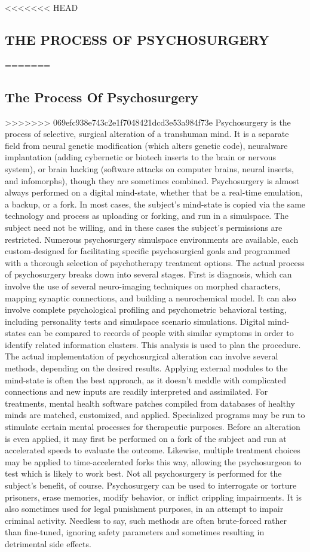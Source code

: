 <<<<<<< HEAD
\subsection{THE PROCESS OF PSYCHOSURGERY}
=======
\subsection{The Process Of Psychosurgery}
>>>>>>> 069efc938e743c2e1f7048421dcd3e53a984f73e
Psychosurgery is the process of selective, surgical alteration
of a transhuman mind. It is a separate field from
neural genetic modification (which alters genetic code),
neuralware implantation (adding cybernetic or biotech
inserts to the brain or nervous system), or brain hacking
(software attacks on computer brains, neural inserts, and
infomorphs), though they are sometimes combined.
Psychosurgery is almost always performed on a
digital mind-state, whether that be a real-time emulation,
a backup, or a fork. In most cases, the subject’s
mind-state is copied via the same technology and process
as uploading or forking, and run in a simulspace.
The subject need not be willing, and in these cases
the subject’s permissions are restricted. Numerous
psychosurgery simulspace environments are available,
each custom-designed for facilitating specific psychosurgical
goals and programmed with a thorough
selection of psychotherapy treatment options.
The actual process of psychosurgery breaks down
into several stages. First is diagnosis, which can
involve the use of several neuro-imaging techniques
on morphed characters, mapping synaptic connections,
and building a neurochemical model. It can
also involve complete psychological profiling and
psychometric behavioral testing, including personality
tests and simulspace scenario simulations. Digital
mind-states can be compared to records of people
with similar symptoms in order to identify related
information clusters. This analysis is used to plan
the procedure.
The actual implementation of psychosurgical alteration
can involve several methods, depending on
the desired results. Applying external modules to the
mind-state is often the best approach, as it doesn’t
meddle with complicated connections and new inputs
are readily interpreted and assimilated. For treatments,
mental health software patches compiled from
databases of healthy minds are matched, customized,
and applied. Specialized programs may be run to
stimulate certain mental processes for therapeutic
purposes. Before an alteration is even applied, it may
first be performed on a fork of the subject and run at
accelerated speeds to evaluate the outcome. Likewise,
multiple treatment choices may be applied to time-accelerated
forks this way, allowing the psychosurgeon
to test which is likely to work best.
Not all psychosurgery is performed for the subject’s
benefit, of course. Psychosurgery can be used to interrogate
or torture prisoners, erase memories, modify
behavior, or inflict crippling impairments. It is also
sometimes used for legal punishment purposes, in
an attempt to impair criminal activity. Needless to
say, such methods are often brute-forced rather than
fine-tuned, ignoring safety parameters and sometimes
resulting in detrimental side effects.


